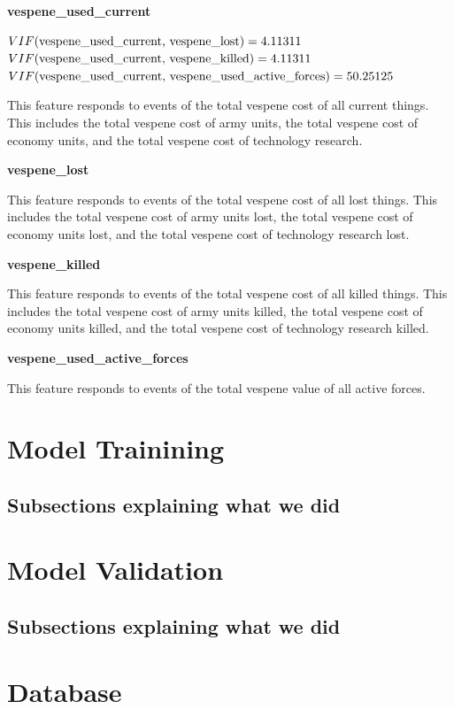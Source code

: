 \documentclass[a4paper,12pt]{report}
\newcommand{\msection}[1]{\noindent\textbf{#1}}
\begin{document}
\msection{vespene\_used\_current}

$VIF(\text{vespene\_used\_current, vespene\_lost}) = \pgfmathparse{1/(1-(-.87)^2)}\pgfmathresult$ \\
$VIF(\text{vespene\_used\_current, vespene\_killed}) = \pgfmathparse{1/(1-(-.87)^2)}\pgfmathresult$ \\
$VIF(\text{vespene\_used\_current, vespene\_used\_active\_forces}) = \pgfmathparse{1/(1-(.99)^2)}\pgfmathresult$

This feature responds to events of the total vespene cost of all current things. This includes the total vespene cost of army units, the total vespene cost of economy units, and the total vespene cost of technology research.

\msection{vespene\_lost}

This feature responds to events of the total vespene cost of all lost things. This includes the total vespene cost of army units lost, the total vespene cost of economy units lost, and the total vespene cost of technology research lost.

\msection{vespene\_killed}

This feature responds to events of the total vespene cost of all killed things. This includes the total vespene cost of army units killed, the total vespene cost of economy units killed, and the total vespene cost of technology research killed.

\msection{vespene\_used\_active\_forces}

This feature responds to events of the total vespene value of all active forces.

\section{Model Trainining}
\subsection{Subsections explaining what we did}
\section{Model Validation}
\subsection{Subsections explaining what we did}
\section{Database}
\end{document}
